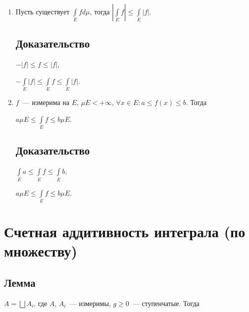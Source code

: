 \documentclass{article}
\begin{document}
\begin{enumerate}
\begin{itemize}
                    \end{itemize}
                    
            \item Пусть существует $\int\limits_{E} f d \mu$, тогда $\left| \int\limits_{E} f \right| \leqslant \int\limits_{E} |f|$.
            
                \subsection{Доказательство}
                
                    $- |f| \leqslant f \leqslant |f|$,
                    
                    $- \int\limits_{E} |f| \leqslant \int\limits_{E} f \leqslant \int\limits_{E} |f|$.
                    
            \item $f$~--- измерима на $E$, $\mu E < +\infty$, $\forall x \in E : a \leqslant f(x) \leqslant b$. Тогда 
            
                $a \mu E \leqslant \int\limits_{E} f \leqslant b \mu E$.
                
                \subsection{Доказательство}
                    
                    $\int\limits_{E} a \leqslant \int\limits_{E} f \leqslant \int\limits_{E} b$,
                    
                    $a \mu E \leqslant \int\limits_{E} f \leqslant b \mu E$.
                
        \end{enumerate}
        
    \newpage
    
    \section{Счетная аддитивность интеграла (по множеству)}
    
        \subsection{Лемма}
    
            $A = \bigsqcup A_i$, где $A$, $A_i$~--- измеримы, $g \geqslant 0$~--- ступенчатые. Тогда
        
\end{document}
